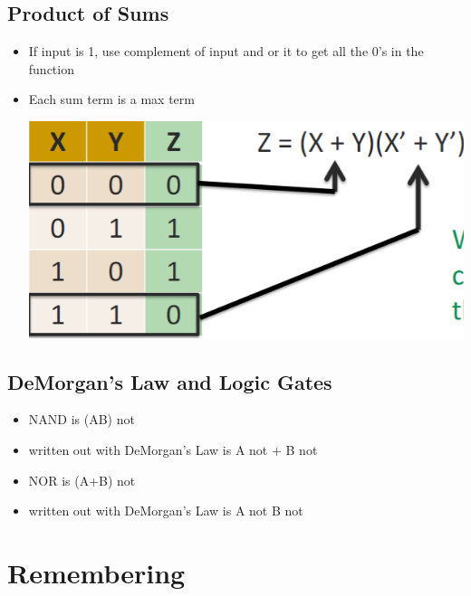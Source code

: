 \documentclass{article}
\begin{document}
\subsection{Product of Sums}

\begin{itemize}
    \item If input is 1, use complement of input and or it to get all the 0's in the function
    
    \item Each sum term is a max term
    
    \includegraphics[scale=0.35]{images/maxterms.png}
\end{itemize}


\subsection{DeMorgan's Law and Logic Gates}

\begin{itemize}
    \item NAND is (AB) not
    
    \item written out with DeMorgan's Law is A not + B not
    
    \item NOR is (A+B) not
    
    \item written out with DeMorgan's Law is A not B not
    
    
\end{itemize}


\section{Remembering}
\end{document}
